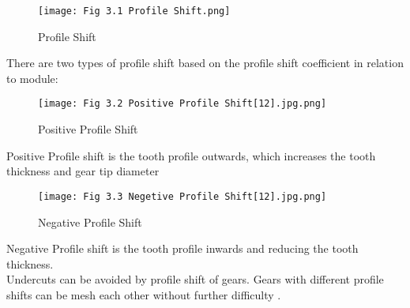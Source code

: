 \documentclass{article}
\begin{document}
\begin{figure}[h]
    \centering
    \texttt{[image: Fig 3.1 Profile Shift.png]}
    \caption{ Profile Shift \cite{mallesh2009effect7}}
    \label{fig:profile_shift}
\end{figure}

There are two types of profile shift based on the profile shift coefficient in relation to module:

\begin{figure}[h]
    \centering
    \texttt{[image: Fig 3.2 Positive Profile Shift[12].jpg.png]}
    \caption{ Positive Profile Shift\cite{KhkGearsProfileShiftCoefficient-12}}
    \label{fig:positive_profile_shift}
\end{figure}
Positive Profile shift is the tooth profile outwards, which increases the tooth thickness and gear tip diameter\\

\begin{figure}[h]
    \centering
    \texttt{[image: Fig 3.3 Negetive Profile Shift[12].jpg.png]}
    \caption{ Negative Profile Shift\cite{KhkGearsProfileShiftCoefficient-12}}
    \label{fig:negative_profile_shift}
\end{figure}
Negative Profile shift is the tooth profile inwards and reducing the tooth thickness.\\

Undercuts can be avoided by profile shift of gears. Gears with different profile shifts can be mesh each other without further difficulty \cite{Profileshift-of-Involute-Gears5}.
\end{document}
